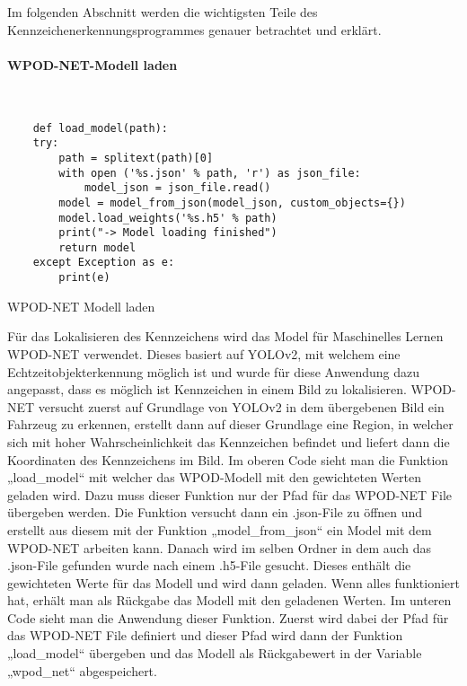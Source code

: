 Im folgenden Abschnitt werden die wichtigsten Teile des Kennzeichenerkennungsprogrammes genauer betrachtet und erklärt.

\paragraph{WPOD-NET-Modell laden}\mbox{}\\

\begin{listing}[H]
    \begin{verbatim}
    def load_model(path):
    try:
        path = splitext(path)[0]
        with open ('%s.json' % path, 'r') as json_file:
            model_json = json_file.read()
        model = model_from_json(model_json, custom_objects={})
        model.load_weights('%s.h5' % path)
        print("-> Model loading finished")
        return model
    except Exception as e:
        print(e)
    \end{verbatim}
    \caption{WPOD-NET Modell laden}
\end{listing}

Für das Lokalisieren des Kennzeichens wird das Model für Maschinelles Lernen WPOD-NET verwendet. Dieses basiert auf YOLOv2, 
mit welchem eine Echtzeitobjekterkennung möglich ist und wurde für diese Anwendung dazu angepasst, dass es möglich ist 
Kennzeichen in einem Bild zu lokalisieren. WPOD-NET versucht zuerst auf Grundlage von YOLOv2 in dem übergebenen Bild 
ein Fahrzeug zu erkennen, erstellt dann auf dieser Grundlage eine Region, in welcher sich mit hoher Wahrscheinlichkeit 
das Kennzeichen befindet und liefert dann die Koordinaten des Kennzeichens im Bild. Im oberen Code sieht man die Funktion 
„load{\_}model“ mit welcher das WPOD-Modell mit den gewichteten Werten geladen wird. Dazu muss dieser Funktion nur der 
Pfad für das WPOD-NET File übergeben werden. Die Funktion versucht dann ein .json-File zu öffnen und erstellt aus 
diesem mit der Funktion „model{\_}from{\_}json“ ein Model mit dem WPOD-NET arbeiten kann. Danach wird im selben Ordner 
in dem auch das .json-File gefunden wurde nach einem .h5-File gesucht. Dieses enthält die gewichteten Werte für das 
Modell und wird dann geladen. Wenn alles funktioniert hat, erhält man als Rückgabe das Modell mit den geladenen Werten. 
Im unteren Code sieht man die Anwendung dieser Funktion. Zuerst wird dabei der Pfad für das WPOD-NET File definiert und 
dieser Pfad wird dann der Funktion „load{\_}model“ übergeben und das Modell als Rückgabewert in der Variable „wpod{\_}net“ abgespeichert.

